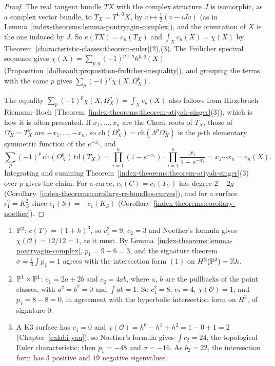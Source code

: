 \begin{proof}
The real tangent bundle $TX$ with the complex structure $J$ is isomorphic, as a complex vector bundle, to $T_X = T^{1,0}X$, by $v \mapsto \frac12(v - iJv)$ (as in Lemma~\ref{index-theorems:lemma-pontryagin-complex}), and the
orientation of $X$ is the one induced by $J$. So $e(TX) = c_n(T_X)$ and $\int_Xc_n(X) = \chi(X)$ by Theorem~\ref{characteristic-classes:theorem-euler}(2),(3). The Fr\"olicher spectral sequence gives
$\chi(X) = \sum_{p,q}(-1)^{p+q}h^{p,q}(X)$ (Proposition~\ref{dolbeault:proposition-frolicher-inequality}), and grouping the terms with the same $p$ gives $\sum_p(-1)^p\chi(X, \Omega^p_X)$.

The equality $\sum_p(-1)^p\chi(X, \Omega^p_X) = \int_Xc_n(X)$ also follows from Hirzebruch--Riemann--Roch (Theorem~\ref{index-theorems:theorem-atiyah-singer}(3)), which is how it is often presented. If $x_1, \ldots, x_n$ are the Chern roots of
$T_X$, those of $\Omega^1_X = T_X^\vee$ are $-x_1, \ldots, -x_n$, so $\mathrm{ch}(\Omega^p_X) = \mathrm{ch}(\Lambda^p\Omega^1_X)$ is the $p$-th elementary symmetric function of the $e^{-x_i}$, and
\[
\sum_p(-1)^p\,\mathrm{ch}(\Omega^p_X)\,\mathrm{td}(T_X) = \prod_{i=1}^n(1 - e^{-x_i}) \cdot \prod_{i=1}^n\frac{x_i}{1 - e^{-x_i}} = x_1 \cdots x_n = c_n(X).
\]
Integrating and summing Theorem~\ref{index-theorems:theorem-atiyah-singer}(3) over $p$ gives the claim. For a curve, $c_1(C) = c_1(T_C)$ has degree $2 - 2g$ (Corollary~\ref{index-theorems:corollary-rr-bundles-curves}), and for
a surface $c_1^2 = K_S^2$ since $c_1(S) = -c_1(K_S)$ (Corollary~\ref{index-theorems:corollary-noether}).
\end{proof}

\begin{example}\label{index-theorems:example-surfaces}
\begin{enumerate}
\item $\mathbb{P}^2$: $c(T) = (1 + h)^3$, so $c_1^2 = 9$, $c_2 = 3$ and Noether's formula gives $\chi(\mathcal{O}) = 12/12 = 1$, as it must. By Lemma~\ref{index-theorems:lemma-pontryagin-complex}, $p_1 = 9 - 6 = 3$, and the signature theorem
$\sigma = \frac13\int p_1 = 1$ agrees with the intersection form $(1)$ on $H^2(\mathbb{P}^2) = \mathbb{Z} h$.
\item $\mathbb{P}^1 \times \mathbb{P}^1$: $c_1 = 2a + 2b$ and $c_2 = 4ab$, where $a$, $b$ are the pullbacks of the point classes, with $a^2 = b^2 = 0$ and $\int ab = 1$. So $c_1^2 = 8$, $c_2 = 4$, $\chi(\mathcal{O}) = 1$, and $p_1 = 8 - 8 = 0$, in agreement with the
hyperbolic intersection form on $H^2$, of signature $0$.
\item A K3 surface has $c_1 = 0$ and $\chi(\mathcal{O}) = h^0 - h^1 + h^2 = 1 - 0 + 1 = 2$ (Chapter~\ref{calabi-yau}), so Noether's formula gives $\int c_2 = 24$, the topological Euler characteristic; then $p_1 = -48$ and
$\sigma = -16$. As $b_2 = 22$, the intersection form has $3$ positive and $19$ negative eigenvalues.
\end{enumerate}
\end{example}

